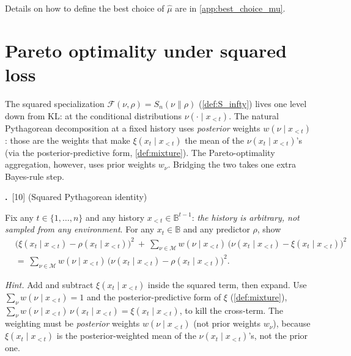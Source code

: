 \documentclass[fontsize=11pt, parskip=half]{scrartcl}
\theoremstyle{definition}
\newcommand{\mysubsection}[2]{\par\medskip\noindent\refstepcounter{subsection}\textbf{\thesubsection.}~#2\par\smallskip}
\newcommand{\Mc}{\mathcal{M}}
\newcommand{\Sn}[2]{S_{n}(#1 \parallel #2)}
\begin{document}
Details on how to define the best choice of $\hat{\mu}$ are in \cref{app:best_choice_mu}.

\section{Pareto optimality under squared loss}\label{prob:sq}

The squared specialization $\mathcal F(\nu, \rho) = \Sn{\nu}{\rho}$ (\cref{def:S_infty}) lives one level down from KL: at the conditional distributions
$\nu(\cdot \mid x_{<t})$. The natural Pythagorean decomposition at a fixed
history uses \emph{posterior} weights $w(\nu \mid x_{<t})$: those are the
weights that make $\xi(x_t \mid x_{<t})$ the mean of the $\nu(x_t \mid x_{<t})$'s
(via the posterior-predictive form, \cref{def:mixture}). The Pareto-optimality
aggregation, however, uses prior weights $w_\nu$. Bridging the two takes one
extra Bayes-rule step.

\mysubsection{1}{[10] (Squared Pythagorean identity)\label{prob:sq_pythag}}

Fix any $t \in \{1, \dots, n\}$ and any history $x_{<t} \in \mathbb{B}^{t-1}$:
\emph{the history is arbitrary, not sampled from any environment}. For any
$x_t \in \mathbb{B}$ and any predictor $\rho$, show
\begin{align*}
  &\bigl(\xi(x_t \mid x_{<t}) - \rho(x_t \mid x_{<t})\bigr)^{2}
  ~+~
  \sum_{\nu \in \Mc} w(\nu \mid x_{<t})\,\bigl(\nu(x_t \mid x_{<t}) - \xi(x_t \mid x_{<t})\bigr)^{2} \\
  &=~
  \sum_{\nu \in \Mc} w(\nu \mid x_{<t})\,\bigl(\nu(x_t \mid x_{<t}) - \rho(x_t \mid x_{<t})\bigr)^{2}.
\end{align*}

\textit{Hint.} Add and subtract $\xi(x_t \mid x_{<t})$ inside the squared term,
then expand. Use $\sum_\nu w(\nu \mid x_{<t}) = 1$ and the posterior-predictive
form of $\xi$ (\cref{def:mixture}), $\sum_\nu w(\nu \mid x_{<t})\,\nu(x_t \mid x_{<t})
= \xi(x_t \mid x_{<t})$, to kill the cross-term. The weighting must be
\emph{posterior} weights $w(\nu \mid x_{<t})$ (not prior weights $w_\nu$),
because $\xi(x_t \mid x_{<t})$ is the posterior-weighted mean of the
$\nu(x_t \mid x_{<t})$'s, not the prior one.
\end{document}
